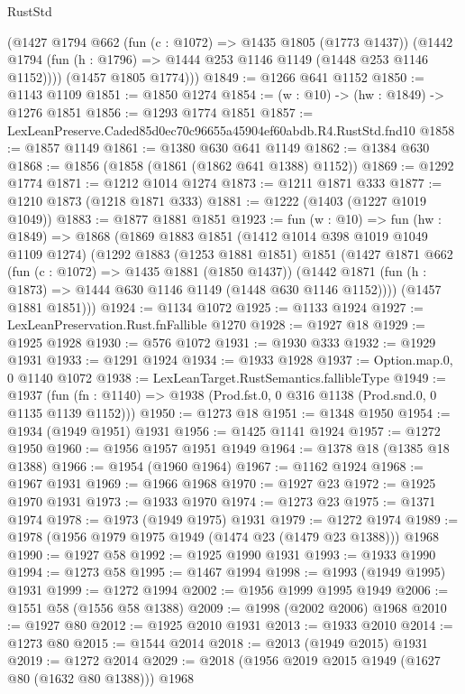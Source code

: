 \begin{lexlean}{RustStd}
\begin{coremodule}
        (@1427
          @1794
          @662
          (fun (c : @1072) => @1435 @1805 (@1773 @1437))
          (@1442 @1794 (fun (h : @1796) => @1444 @253 @1146 @1149 (@1448 @253 @1146 @1152))))
        (@1457 @1805 @1774)))
@1849 := @1266 @641 @1152
@1850 := @1143 @1109
@1851 := @1850 @1274
@1854 := (w : @10) -> (hw : @1849) -> @1276 @1851
@1856 := @1293 @1774 @1851
@1857 := LexLeanPreserve.Caded85d0ec70c96655a45904ef60abdb.R4.RustStd.fnd10
@1858 := @1857 @1149
@1861 := @1380 @630 @641 @1149
@1862 := @1384 @630
@1868 := @1856 (@1858 (@1861 (@1862 @641 @1388) @1152))
@1869 := @1292 @1774
@1871 := @1212 @1014 @1274
@1873 := @1211 @1871 @333
@1877 := @1210 @1873 (@1218 @1871 @333)
@1881 := @1222 (@1403 (@1227 @1019 @1049))
@1883 := @1877 @1881 @1851
@1923 := fun (w : @10) =>
  fun (hw : @1849) =>
  @1868
    (@1869
      @1883
      @1851
      (@1412 @1014 @398 @1019 @1049 @1109 @1274)
      (@1292
        @1883
        (@1253 @1881 @1851)
        @1851
        (@1427
          @1871
          @662
          (fun (c : @1072) => @1435 @1881 (@1850 @1437))
          (@1442 @1871 (fun (h : @1873) => @1444 @630 @1146 @1149 (@1448 @630 @1146 @1152))))
        (@1457 @1881 @1851)))
@1924 := @1134 @1072
@1925 := @1133 @1924
@1927 := LexLeanPreservation.Rust.fnFallible @1270
@1928 := @1927 @18
@1929 := @1925 @1928
@1930 := @576 @1072
@1931 := @1930 @333
@1932 := @1929 @1931
@1933 := @1291 @1924
@1934 := @1933 @1928
@1937 := Option.map.{0, 0} @1140 @1072
@1938 := LexLeanTarget.RustSemantics.fallibleType
@1949 := @1937
    (fun (fn : @1140) => @1938 (Prod.fst.{0, 0} @316 @1138 (Prod.snd.{0, 0} @1135 @1139 @1152)))
@1950 := @1273 @18
@1951 := @1348 @1950
@1954 := @1934 (@1949 @1951) @1931
@1956 := @1425 @1141 @1924
@1957 := @1272 @1950
@1960 := @1956 @1957 @1951 @1949
@1964 := @1378 @18 (@1385 @18 @1388)
@1966 := @1954 (@1960 @1964)
@1967 := @1162 @1924
@1968 := @1967 @1931
@1969 := @1966 @1968
@1970 := @1927 @23
@1972 := @1925 @1970 @1931
@1973 := @1933 @1970
@1974 := @1273 @23
@1975 := @1371 @1974
@1978 := @1973 (@1949 @1975) @1931
@1979 := @1272 @1974
@1989 := @1978 (@1956 @1979 @1975 @1949 (@1474 @23 (@1479 @23 @1388))) @1968
@1990 := @1927 @58
@1992 := @1925 @1990 @1931
@1993 := @1933 @1990
@1994 := @1273 @58
@1995 := @1467 @1994
@1998 := @1993 (@1949 @1995) @1931
@1999 := @1272 @1994
@2002 := @1956 @1999 @1995 @1949
@2006 := @1551 @58 (@1556 @58 @1388)
@2009 := @1998 (@2002 @2006) @1968
@2010 := @1927 @80
@2012 := @1925 @2010 @1931
@2013 := @1933 @2010
@2014 := @1273 @80
@2015 := @1544 @2014
@2018 := @2013 (@1949 @2015) @1931
@2019 := @1272 @2014
@2029 := @2018 (@1956 @2019 @2015 @1949 (@1627 @80 (@1632 @80 @1388))) @1968

\end{coremodule}
\end{lexlean}
